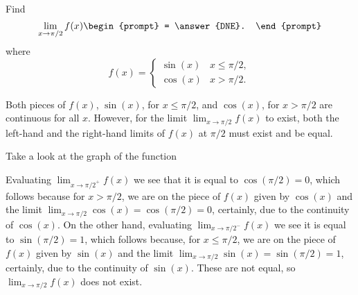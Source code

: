 \documentclass{ximera}
\author{Gregory Hartman \and Matthew Carr}
\begin{document}
\begin{exercise}




  Find 
  \[
  \lim_{x\to \pi/2} f(x)
  \begin{prompt}
  = \answer{DNE}.
  \end{prompt}
  \]
  where
  \[
  f(x) = \left\{\begin{array}{cl} \sin(x) & x\leq \pi/2, \\ \cos(x) & x>\pi/2. \end{array}\right.
  \]
    \begin{hint}
     Both pieces of $f(x)$, $\sin(x)$, for $x\leq\pi/2$, and $\cos(x)$, for $x>\pi/2$ are continuous for all $x$. However, for the limit $\lim_{x\to\pi/2}f(x)$ to exist, both the left-hand and the right-hand limits of $f(x)$ at $\pi/2$ must exist and be equal.
    \end{hint}
     \begin{hint}
    	Take a look at the graph of the function
    \begin{center}
      \end{center} 
    \end{hint}
    \begin{hint}
     Evaluating $\lim_{x\to{\pi/2}^{+}}f(x)$ we see that it is equal to $\cos(\pi/2)=0$, which follows because for $x>\pi/2$, we are on the piece of $f(x)$ given by $\cos(x)$ and the limit $\lim_{x\to{\pi/2}}\cos(x)=\cos(\pi/2)=0$, certainly, due to the continuity of $\cos(x)$. On the other hand, evaluating $\lim_{x\to{\pi/2}^{-}}f(x)$ we see it is equal to $\sin(\pi/2)=1$, which follows because, for $x\leq\pi/2$, we are on the piece of $f(x)$ given by $\sin(x)$ and the limit $\lim_{x\to\pi/2}\sin(x)=\sin(\pi/2)=1$, certainly, due to the continuity of $\sin(x)$. These are not equal, so $\lim_{x\to\pi/2}f(x)$ does not exist.
    \end{hint}
\end{exercise}
\end{document}
